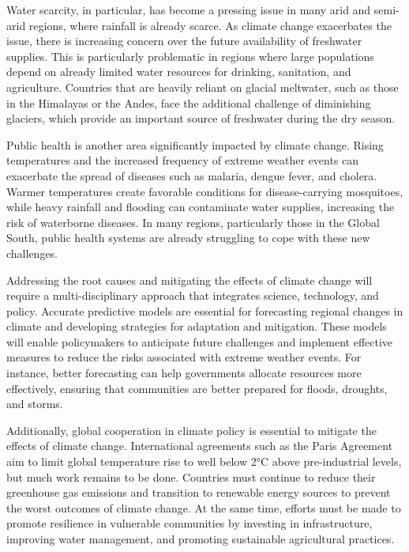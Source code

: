 Water scarcity, in particular, has become a pressing issue in many arid and semi-arid regions, where rainfall is already scarce. As climate change exacerbates the issue, there is increasing concern over the future availability of freshwater supplies. This is particularly problematic in regions where large populations depend on already limited water resources for drinking, sanitation, and agriculture. Countries that are heavily reliant on glacial meltwater, such as those in the Himalayas or the Andes, face the additional challenge of diminishing glaciers, which provide an important source of freshwater during the dry season.

Public health is another area significantly impacted by climate change. Rising temperatures and the increased frequency of extreme weather events can exacerbate the spread of diseases such as malaria, dengue fever, and cholera. Warmer temperatures create favorable conditions for disease-carrying mosquitoes, while heavy rainfall and flooding can contaminate water supplies, increasing the risk of waterborne diseases. In many regions, particularly those in the Global South, public health systems are already struggling to cope with these new challenges.

Addressing the root causes and mitigating the effects of climate change will require a multi-disciplinary approach that integrates science, technology, and policy. Accurate predictive models are essential for forecasting regional changes in climate and developing strategies for adaptation and mitigation. These models will enable policymakers to anticipate future challenges and implement effective measures to reduce the risks associated with extreme weather events. For instance, better forecasting can help governments allocate resources more effectively, ensuring that communities are better prepared for floods, droughts, and storms.

Additionally, global cooperation in climate policy is essential to mitigate the effects of climate change. International agreements such as the Paris Agreement aim to limit global temperature rise to well below 2°C above pre-industrial levels, but much work remains to be done. Countries must continue to reduce their greenhouse gas emissions and transition to renewable energy sources to prevent the worst outcomes of climate change. At the same time, efforts must be made to promote resilience in vulnerable communities by investing in infrastructure, improving water management, and promoting sustainable agricultural practices.

